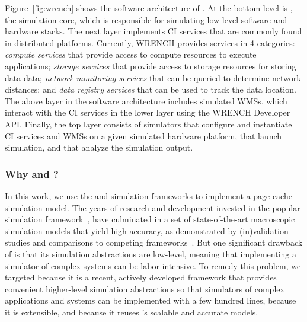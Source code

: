 Figure~\ref{fig:wrench} shows the software architecture of \wrench. 
At the bottom level is \simgrid, the simulation core, which is responsible for 
simulating low-level software and hardware stacks.
The next layer implements CI services that are commonly
found in distributed platforms.
Currently, WRENCH provides services in 4 categories: 
\textit{compute services} that provide access to compute resources to 
execute applications; 
\textit{storage services} that provide access to storage resources for 
storing data data; 
\textit{network monitoring services} that can be queried to
determine network distances; and 
\textit{data registry services} that can be used to track the data location.
The above layer in the software architecture includes simulated WMSs, 
which interact with the CI services in the lower layer using the WRENCH 
Developer API.
Finally, the top layer consists of simulators that configure and instantiate 
CI services and WMSs on a given simulated hardware platform, that launch
simulation, and that analyze the simulation output.

\subsubsection{Why \simgrid and \wrench?}

In this work, we use the \simgrid and \wrench simulation
frameworks to implement a page cache simulation model.  
The years of research and development invested in
the popular \simgrid simulation framework~\cite{casanova2014simgrid}, have
culminated in a set of state-of-the-art macroscopic simulation
models that yield high accuracy, as demonstrated by
(in)validation studies and comparisons to competing
frameworks~\cite{smpi_validity, velhoTOMACS2013, simutool_09,
nstools_07, lebre2015, pouilloux:hal-01197274,
smpi_tpds2017,  7885814, 8048921, 7384330}.  
But one significant drawback of \simgrid is that its simulation
abstractions are low-level, meaning that implementing a
simulator of complex systems can be labor-intensive. 
To remedy this problem, we targeted \wrench because it is a recent,
actively developed framework that provides convenient higher-level 
simulation abstractions so that simulators of complex applications and
systems can be implemented with a few hundred lines, because it is extensible, 
and because it reuses \simgrid's scalable and accurate models.